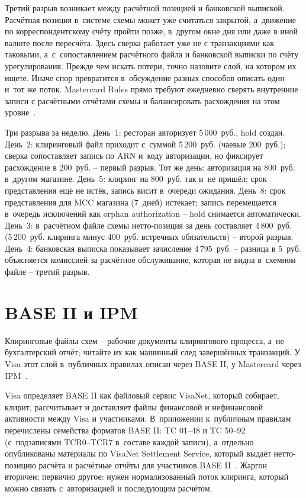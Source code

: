 Третий разрыв возникает между расчётной позицией и банковской выпиской.
Расчётная позиция в~системе схемы может уже считаться закрытой, а~движение по
корреспондентскому счёту пройти позже, в~другом окне дня или даже в
иной валюте после пересчёта. Здесь сверка работает уже не с
транзакциями как таковыми, а~с~сопоставлением расчётного файла и
банковской выписки по счёту урегулирования. Прежде чем искать
потери, точно назовите слой, на котором их ищете. Иначе спор
превратится в~обсуждение разных способов описать один и~тот же поток.
Mastercard Rules прямо требуют ежедневно сверять внутренние записи с
расчётными отчётами схемы и балансировать расхождения на этом уровне~\cite{mc-rules}.

Три разрыва за неделю.
День~1: ресторан авторизует 5\,000~руб., hold
создан. День~2: клиринговый файл приходит с~суммой
5\,200~руб. (чаевые 200~руб.); сверка сопоставляет запись
по ARN и~коду авторизации, но фиксирует расхождение
в 200~руб. -- первый разрыв. Тот же день: авторизация на
800~руб. в~другом магазине. День~5: клиринг на 800~руб.
так и~не пришёл; срок представления ещё не истёк, запись
висит в~очереди ожидания. День~8: срок представления для MCC
магазина (7~дней) истекает; запись перемещается в~очередь
исключений как orphan authorization -- hold снимается
автоматически. День~3: в~расчётном файле схемы нетто-позиция
за день составляет 4\,800~руб. (5\,200~руб. клиринга минус
400~руб. встречных обязательств) -- второй разрыв. День~4:
банковская выписка показывает зачисление 4\,795~руб. --
разница в 5~руб. объясняется комиссией за расчётное
обслуживание, которая не видна в~схемном файле -- третий
разрыв.

\section{BASE II и IPM}\label{sec:recon-base2-ipm}

Клиринговые файлы схем -- рабочие документы клирингового процесса,
а~не бухгалтерский отчёт; читайте их как машинный след
завершённых транзакций. У Visa этот слой в~публичных правилах
описан через BASE II, у Mastercard через IPM~\cite{visa-core-rules,mc-pfmi-disclosure}.

Visa определяет BASE II как файловый сервис VisaNet, который собирает,
клирит, рассчитывает и доставляет файлы финансовой и нефинансовой
активности между Visa и участниками. В~приложении к~публичным правилам
перечислены семейства форматов BASE II: TC 01--48
и TC 50--92 (с~подзаписями TCR0--TCR7 в~составе каждой записи), а~отдельно опубликованы материалы по VisaNet Settlement Service,
который выдаёт нетто-позицию расчёта и расчётные отчёты для участников
BASE II~\cite{visa-core-rules}. Жаргон вторичен; первично другое:
нужен нормализованный поток клиринга, который можно связать
с~авторизацией и последующим расчётом.

